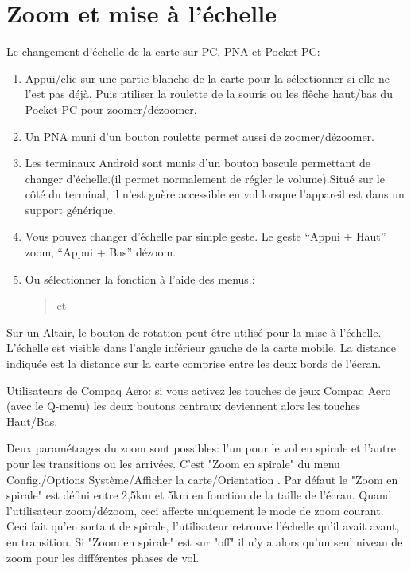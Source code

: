 \section{Zoom et mise à l'échelle}\label{sec:zooming}
Le changement d'échelle de la carte sur PC, PNA et Pocket PC:
\begin{enumerate}
\item Appui/clic sur une partie blanche de la carte pour la sélectionner si elle ne l'est pas déjà.
Puis utiliser la roulette de la souris ou les flêche haut/bas du Pocket PC pour zoomer/dézoomer.
\item Un PNA muni d'un bouton roulette permet aussi de zoomer/dézoomer.
\item Les terminaux Android sont munis d'un bouton bascule permettant de changer d'échelle.(il permet normalement de régler le volume).Situé sur le côté du terminal, il n'est guère accessible en vol lorsque l'appareil est dans un support générique.
\item Vous pouvez changer d'échelle par simple geste. Le geste  
``Appui + Haut'' zoom, ``Appui + Bas'' dézoom.
\item Ou sélectionner la fonction à l'aide des menus.:
\begin{quote}
\blink{} et \blink{}
\end{quote}
\end{enumerate}
Sur un Altair, le bouton de rotation peut être utilisé pour la mise à l'échelle.
L'échelle est visible dans l'angle inférieur gauche de la carte mobile.
La distance indiquée est la distance sur la carte comprise entre les deux bords de l'écran.

Utilisateurs de Compaq Aero: si vous activez les touches de jeux Compaq Aero (avec le Q-menu) les deux boutons centraux deviennent alors les touches Haut/Bas.

Deux paramétrages du zoom sont possibles: l'un pour le vol en spirale et l'autre pour les transitions ou les arrivées. C'est "Zoom en spirale" du menu Config./Options Système/Afficher la carte/Orientation  . Par défaut le  "Zoom en spirale" est défini entre 2,5km et 5km en fonction de la taille de l'écran. Quand l'utilisateur zoom/dézoom, ceci affecte uniquement le mode de zoom courant. Ceci fait qu'en sortant de spirale, l'utilisateur retrouve l'échelle qu'il avait avant, en transition. Si  "Zoom en spirale" est sur "off"  il n'y a alors qu'un seul niveau de zoom pour les différentes phases de vol.

